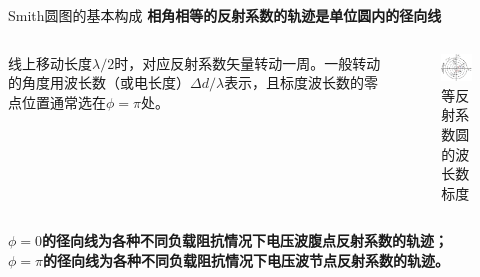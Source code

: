 \begin{frame}{Smith圆图的基本构成}
  \textbf{相角相等的反射系数的轨迹是单位圆内的径向线}
  \begin{columns}
    \begin{column}{0.4\linewidth}
      线上移动长度$\lambda/2$时，对应反射系数矢量转动一周。一般转动的角度用波长数（或电长度）$\Delta d/\lambda$表示，且标度波长数的零点位置通常选在$\phi=\pi$处。
    \end{column}
    \begin{column}{0.6\linewidth}
      \begin{figure}
        \includegraphics[width=5cm]{reflect_coeff.png}
        \caption{等反射系数圆的波长数标度}
      \end{figure}
    \end{column}
  \end{columns}
  $\phi=0$\textbf{的径向线为各种不同负载阻抗情况下电压波腹点反射系数的轨迹；}\\
  $\phi=\pi$\textbf{的径向线为各种不同负载阻抗情况下电压波节点反射系数的轨迹。}
\end{frame}

